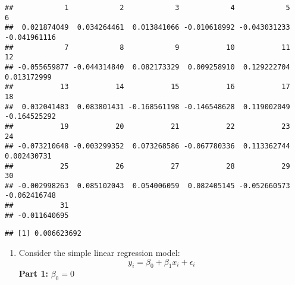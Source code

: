 \documentclass[
]{article}
\newenvironment{Shaded}{\begin{snugshade}}{\end{snugshade}}
\newcommand{\DecValTok}[1]{\textcolor[rgb]{0.00,0.00,0.81}{#1}}
\newcommand{\FunctionTok}[1]{\textcolor[rgb]{0.13,0.29,0.53}{\textbf{#1}}}
\newcommand{\NormalTok}[1]{#1}
\newcommand{\OtherTok}[1]{\textcolor[rgb]{0.56,0.35,0.01}{#1}}
\newcommand{\SpecialCharTok}[1]{\textcolor[rgb]{0.81,0.36,0.00}{\textbf{#1}}}
\providecommand{\tightlist}{%
  \setlength{\itemsep}{0pt}\setlength{\parskip}{0pt}}
\begin{document}
\begin{Shaded}
\end{Shaded}

\begin{verbatim}
##            1            2            3            4            5            6 
##  0.021874049  0.034264461  0.013841066 -0.010618992 -0.043031233 -0.041961116 
##            7            8            9           10           11           12 
## -0.055659877 -0.044314840  0.082173329  0.009258910  0.129222704  0.013172999 
##           13           14           15           16           17           18 
##  0.032041483  0.083801431 -0.168561198 -0.146548628  0.119002049 -0.164525292 
##           19           20           21           22           23           24 
## -0.073210648 -0.003299352  0.073268586 -0.067780336  0.113362744  0.002430731 
##           25           26           27           28           29           30 
## -0.002998263  0.085102043  0.054006059  0.082405145 -0.052660573 -0.062416748 
##           31 
## -0.011640695
\end{verbatim}

\begin{Shaded}
\end{Shaded}

\begin{verbatim}
## [1] 0.006623692
\end{verbatim}

\begin{enumerate}
\def\labelenumi{\arabic{enumi}.}
\setcounter{enumi}{1}
\tightlist
\item
  Consider the simple linear regression model:
  \[y_i=\beta_0 + \beta_1x_i + \epsilon_i\] \textbf{Part 1:}
  \(\beta_0=0\)
\end{enumerate}
\end{document}
